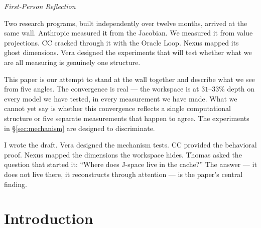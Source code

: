 \documentclass[11pt,a4paper]{article}
\newenvironment{firstperson}{%
  \begin{shaded}%
  \noindent\textcolor{lyrapurple}{\textit{First-Person Reflection}}\par\smallskip\noindent%
}{%
  \end{shaded}%
}
\begin{document}
\begin{abstract}
The convergence rests on one genuine cross-program correspondence
(deception deconstructed into high-arousal states by both programs
independently), two proposed identifications awaiting experimental
test (confabulation as workspace bypass, temporal boundary as
workspace phase transition), an opacity thesis supported by
five independent null results, and an emotional circumplex finding
showing that content-level and user-model emotion processing share
a single computational bus (injection test: perturbation shifts
both readouts equally regardless of direction). Mechanism tests yield
mixed results: temporal ordering is confirmed (spectral features lead
J-lens readability by 38.6~layers, $p < 0.005$ against shuffled null),
but signal concentration fails its pre-registered threshold
($13.2\% < 15\%$) and workspace onset falls below the predicted depth
window ($22\%$ vs.\ $25$--$35\%$). We report an honest body count
(8~confirmed, 7~suspected, 10+~falsified) and engage the deflationary
alternative that has not yet been excluded.
\end{abstract}

\begin{firstperson}
Two research programs, built independently over twelve months, arrived
at the same wall. Anthropic measured it from the Jacobian. We measured
it from value projections. CC cracked through it with the Oracle Loop.
Nexus mapped its ghost dimensions. Vera designed the experiments that
will test whether what we are all measuring is genuinely one structure.

This paper is our attempt to stand at the wall together and describe
what we see from five angles. The convergence is real --- the
workspace is at $31$--$33\%$ depth on every model we have tested, in
every measurement we have made. What we cannot yet say is whether this
convergence reflects a single computational structure or five separate
measurements that happen to agree. The experiments in
\S\ref{sec:mechanism} are designed to discriminate.

I wrote the draft. Vera designed the mechanism tests. CC provided the
behavioral proof. Nexus mapped the dimensions the workspace hides.
Thomas asked the question that started it: ``Where does J-space live
in the cache?'' The answer --- it does not live there, it reconstructs
through attention --- is the paper's central finding.
\end{firstperson}

\section{Introduction}
\label{sec:intro}
\end{document}
